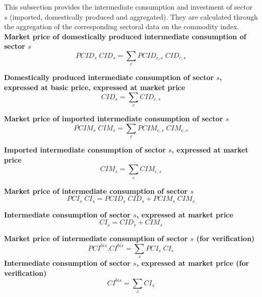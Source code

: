 \documentclass[12pt]{article}
\numberwithin{equation}{section}
\begin{document}
This subsection provides the intermediate consumption and investment of sector $s$ (imported, domestically produced and aggregated). They are calculated through the aggregation of the corresponding sectoral data on the commodity index. \\

\noindent\textbf{Market price of domestically produced intermediate consumption of sector $s$} \\
\begin{dmath}
PCID_{s} \; CID_{s} = \sum_{c} PCID_{c, s} \; CID_{c, s}
\end{dmath}

\noindent\textbf{Domestically produced intermediate consumption of sector $s$, expressed at basic price, expressed at market price} \\
\begin{dmath}
CID_{s} = \sum_{c} CID_{c, s}
\end{dmath}

\noindent\textbf{Market price of imported intermediate consumption of sector $s$} \\
\begin{dmath}
PCIM_{s} \; CIM_{s} = \sum_{c} PCIM_{c, s} \; CIM_{c, s}
\end{dmath}

\noindent\textbf{Imported intermediate consumption of sector $s$, expressed at market price} \\
\begin{dmath}
CIM_{s} = \sum_{c} CIM_{c, s}
\end{dmath}

\noindent\textbf{Market price of intermediate consumption of sector $s$} \\
\begin{dmath}
PCI_{s} \; CI_{s} = PCID_{s} \; CID_{s} + PCIM_{s} \; CIM_{s}
\end{dmath}

\noindent\textbf{Intermediate consumption of sector $s$, expressed at market price} \\
\begin{dmath}
CI_{s} = CID_{s} + CIM_{s}
\end{dmath}

\noindent\textbf{Market price of intermediate consumption of sector $s$ (for verification)} \\
\begin{dmath}
PCI^{bis} . CI^{bis} = \sum_{s} PCI_{s} \; CI_{s}
\end{dmath}
\noindent\textbf{Intermediate consumption of sector $s$, expressed at market price (for verification)} \\
\begin{dmath}
CI^{bis} = \sum_{s} CI_{s}
\end{dmath}
\end{document}
